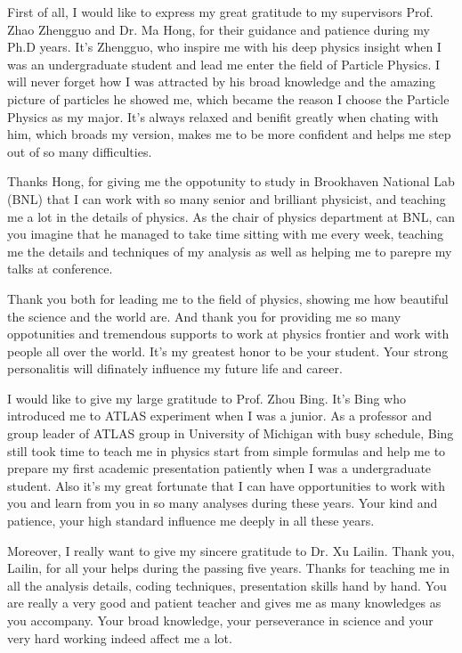 
\begin{acknowledgments}

First of all, I would like to express my great gratitude to my supervisors Prof. Zhao Zhengguo and Dr. Ma Hong, for their guidance and patience during my Ph.D years.
It's Zhengguo, who inspire me with his deep physics insight when I was an undergraduate student and lead me enter the field of Particle Physics.
I will never forget how I was attracted by his broad knowledge and the amazing picture of particles he showed me, which became the reason I choose the Particle Physics as my major.
It's always relaxed and benifit greatly when chating with him, which broads my version, makes me to be more confident and helps me step out of so many difficulties.

Thanks Hong, for giving me the oppotunity to study in Brookhaven National Lab (BNL) that I can work with so many senior and brilliant physicist, and teaching me a lot in the details of physics.
As the chair of physics department at BNL, can you imagine that he managed to take time sitting with me every week, teaching me the details and techniques of my analysis
as well as helping me to parepre my talks at conference.

Thank you both for leading me to the field of physics, showing me how beautiful the science and the world are. 
And thank you for providing me so many oppotunities and tremendous supports to work at physics frontier and work with people all over the world.
It's my greatest honor to be your student.
Your strong personalitis will difinately influence my future life and career.

I would like to give my large gratitude to Prof. Zhou Bing.
It's Bing who introduced me to ATLAS experiment when I was a junior. 
As a professor and group leader of ATLAS group in University of Michigan with busy schedule, 
Bing still took time to teach me in physics start from simple formulas and help me to prepare my first academic presentation patiently when I was a undergraduate student.
Also it's my great fortunate that I can have opportunities to work with you and learn from you in so many analyses during these years.
Your kind and patience, your high standard influence me deeply in all these years.

Moreover, I really want to give my sincere gratitude to Dr. Xu Lailin.
Thank you, Lailin, for all your helps during the passing five years.
Thanks for teaching me in all the analysis details, coding techniques, presentation skills hand by hand.
You are really a very good and patient teacher and gives me as many knowledges as you accompany.
Your broad knowledge, your perseverance in science and your very hard working indeed affect me a lot.


\end{acknowledgments}
